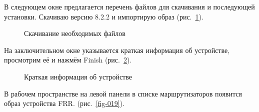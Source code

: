 \documentclass[
  english,
  russian,
  12pt,
  a4paper,
  DIV=11,
  numbers=noendperiod]{scrreprt}
\begin{document}
В следующем окне предлагается перечень файлов для скачивания и
последующей установки. Скачиваю версию 8.2.2 и импортирую образ
(рис.~\ref{fig-017}).

\begin{figure}


\caption{\label{fig-017}Скачивание необходимых файлов}

\end{figure}%

На заключительном окне указывается краткая информация об устройстве,
просмотрим её и нажмём Finish (рис.~\ref{fig-018}).

\begin{figure}


\caption{\label{fig-018}Краткая информация об устройстве}

\end{figure}%

В рабочем пространстве на левой панели в списке маршрутизаторов появится
образ устройства FRR. (рис.~\ref{fig-019}).
\end{document}
